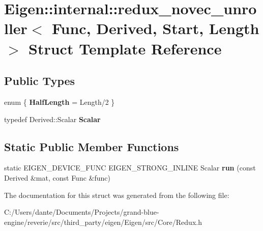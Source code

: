 \hypertarget{struct_eigen_1_1internal_1_1redux__novec__unroller}{}\section{Eigen\+::internal\+::redux\+\_\+novec\+\_\+unroller$<$ Func, Derived, Start, Length $>$ Struct Template Reference}
\label{struct_eigen_1_1internal_1_1redux__novec__unroller}
\subsection*{Public Types}
\begin{DoxyCompactItemize}
\item 
\mbox{\label{struct_eigen_1_1internal_1_1redux__novec__unroller_ad7f7b0df310be1d2ab91f03ea26ea2c7}} 
enum \{ {\bfseries Half\+Length} = Length/2
 \}
\item 
\mbox{\label{struct_eigen_1_1internal_1_1redux__novec__unroller_a77060572615dfca306cf2ee47ebe722d}} 
typedef Derived\+::\+Scalar {\bfseries Scalar}
\end{DoxyCompactItemize}
\subsection*{Static Public Member Functions}
\begin{DoxyCompactItemize}
\item 
\mbox{\label{struct_eigen_1_1internal_1_1redux__novec__unroller_aa83c93f6cbbd592b9b96f7e7ad62fb90}} 
static E\+I\+G\+E\+N\+\_\+\+D\+E\+V\+I\+C\+E\+\_\+\+F\+U\+NC E\+I\+G\+E\+N\+\_\+\+S\+T\+R\+O\+N\+G\+\_\+\+I\+N\+L\+I\+NE Scalar {\bfseries run} (const Derived \&mat, const Func \&func)
\end{DoxyCompactItemize}


The documentation for this struct was generated from the following file\+:\begin{DoxyCompactItemize}
\item 
C\+:/\+Users/dante/\+Documents/\+Projects/grand-\/blue-\/engine/reverie/src/third\+\_\+party/eigen/\+Eigen/src/\+Core/Redux.\+h\end{DoxyCompactItemize}
